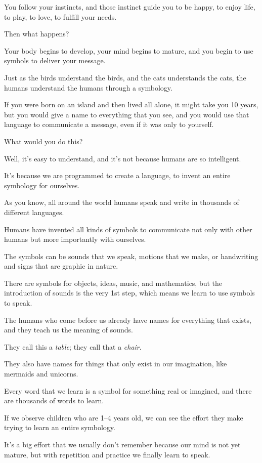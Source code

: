 \documentclass{article}
\numberwithin{equation}{section}
\begin{document}
You follow your instincts, and those instinct guide you to be happy, to enjoy life, to play, to love, to fulfill your needs.

Then what happens?

Your body begins to develop, your mind begins to mature, and you begin to use symbols to deliver your message.

Just as the birds understand the birds, and the cats understands the cats, the humans understand the humans through a symbology.

If you were born on an island and then lived all alone, it might take you 10 years, but you would give a name to everything that you see, and you would use that language to communicate a message, even if it was only to yourself.

What would you do this?

Well, it's easy to understand, and it's not because humans are so intelligent.

It's because we are programmed to create a language, to invent an entire symbology for ourselves.

%
As you know, all around the world humans speak and write in thousands of different languages.

Humans have invented all kinds of symbols to communicate not only with other humans but more importantly with ourselves.

The symbols can be sounds that we speak, motions that we make, or handwriting and signs that are graphic in nature.

There are symbols for objects, ideas, music, and mathematics, but the introduction of sounds is the very 1st step, which means we learn to use symbols to speak.

%
The humans who come before us already have names for everything that exists, and they teach us the meaning of sounds.

They call this a \textit{table}; they call that a \textit{chair}.

They also have names for things that only exist in our imagination, like mermaids and unicorns.

Every word that we learn is a symbol for something real or imagined, and there are thousands of words to learn.

If we observe children who are 1--4 years old, we can see the effort they make trying to learn an entire symbology.

It's a big effort that we usually don't remember because our mind is not yet mature, but with repetition and practice we finally learn to speak.
\end{document}
